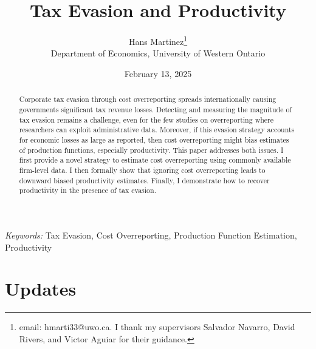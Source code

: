 \documentclass[
  12pt]{article}
\theoremstyle{definition}
\theoremstyle{remark}
\begin{document}
\def\spacingset#1{\renewcommand{\baselinestretch}%
{#1}\small\normalsize} \spacingset{1}



\date{February 13, 2025}
\title{\bf Tax Evasion and Productivity}
\author{
Hans Martinez\thanks{email: hmarti33@uwo.ca. I thank my supervisors
Salvador Navarro, David Rivers, and Victor Aguiar for their guidance.}\\
Department of Economics, University of Western Ontario\\
}
\maketitle

\bigskip
\bigskip
\begin{abstract}
Corporate tax evasion through cost overreporting spreads internationally
causing governments significant tax revenue losses. Detecting and
measuring the magnitude of tax evasion remains a challenge, even for the
few studies on overreporting where researchers can exploit
administrative data. Moreover, if this evasion strategy accounts for
economic losses as large as reported, then cost overreporting might bias
estimates of production functions, especially productivity. This paper
addresses both issues. I first provide a novel strategy to estimate cost
overreporting using commonly available firm-level data. I then formally
show that ignoring cost overreporting leads to downward biased
productivity estimates. Finally, I demonstrate how to recover
productivity in the presence of tax evasion.
\end{abstract}

\noindent%
{\it Keywords:} Tax Evasion, Cost Overreporting, Production Function
Estimation, Productivity
\vfill

\newpage
\spacingset{1.9} %

\section*{Updates}\label{updates}
\end{document}
